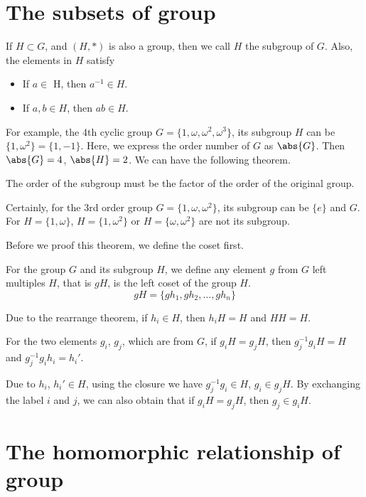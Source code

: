 \section{The subsets of group}

\begin{definition}
    If $H\subset G$, and $(H,*)$ is also a group, then we call $H$ the subgroup of $G$. Also, the elements in $H$ satisfy
    \begin{itemize}
        \item If $a\in$ H, then $a^{-1}\in H$.
        \item If $a,b\in H$, then $ab\in H$.
    \end{itemize}
\end{definition}

For example, the 4th cyclic group $G=\{1,\omega,\omega^2,\omega^3\}$, its subgroup $H$ can be $\{1,\omega^2\}=\{1,-1\}$. Here, we express the order number of $G$ as $\abs{G}$. Then $\abs{G}=4$, $\abs{H}=2$. We can have the following theorem.

\begin{theorem}
    The order of the subgroup must be the factor of the order of the original group.
\end{theorem}

Certainly, for the 3rd order group $G=\{1,\omega,\omega^2\}$, its subgroup can be $\{e\}$ and $G$. For $H=\{1,\omega\}$, $H=\{1,\omega^2\}$ or $H=\{\omega,\omega^2\}$ are not its subgroup.

Before we proof this theorem, we define the coset first.

\begin{definition}
    For the group $G$ and its subgroup $H$, we define any element $g$ from $G$ left multiples $H$, that is $gH$, is the left coset of the group $H$.
    \[gH=\{gh_1,gh_2,\ldots,gh_n\}\]
\end{definition}

Due to the rearrange theorem, if $h_i\in H$, then $h_iH=H$ and $HH=H$.

For the two elements $g_i$, $g_j$, which are from $G$, if $g_iH=g_jH$, then $g_j^{-1}g_iH=H$ and $g_j^{-1}g_ih_i=h_i'$.

Due to $h_i$, $h_i'\in H$, using the closure we have $g_j^{-1}g_i\in H$, $g_i\in g_jH$. By exchanging the label $i$ and $j$, we can also obtain that if $g_iH=g_jH$, then $g_j\in g_iH$.

\section{The homomorphic relationship of group}


